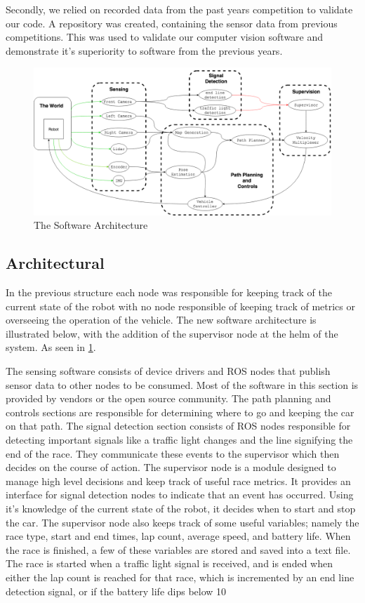 \documentclass[11pt,journal]{IEEEtran}
\begin{document}
Secondly, we relied on recorded data from the past years competition to validate our code. A repository was created, containing the sensor data from previous competitions. This was used to validate our computer vision software and demonstrate it's superiority to software from the previous years.

\begin{figure}[ht]
\centerline{\includegraphics[width=2\columnwidth]{CodeStructure.png}}
\caption{The Software Architecture}
\label{Arch}
\end{figure}
\subsection{Architectural}
In the previous structure each node was responsible for keeping track of the current state of the robot with no node responsible of keeping track of metrics or overseeing the operation of the vehicle. The new software architecture is illustrated below, with the addition of the supervisor node at the helm of the system. As seen in \ref{Arch}.

The sensing software consists of device drivers and ROS nodes that publish sensor data to other nodes to be consumed. Most of the software in this section is provided by vendors or the open source community.
The path planning and controls sections are responsible for determining where to go and keeping the car on that path.
The signal detection section consists of ROS nodes responsible for detecting important signals like a traffic light changes and the line signifying the end of the race. They communicate these events to the supervisor which then decides on the course of action.
The supervisor node is a module designed to manage high level decisions and keep track of useful race metrics. It provides an interface for signal detection nodes to indicate that an event has occurred. Using it's knowledge of the current state of the robot, it decides when to start and stop the car.
The supervisor node also keeps track of some useful variables; namely the race type, start and end times, lap count, average speed, and battery life. When the race is finished, a few of these variables are stored and saved into a text file. The race is started when a traffic light signal is received, and is ended when either the lap count is reached for that race, which is incremented by an end line detection signal, or if the battery life dips below 10%
\end{document}
